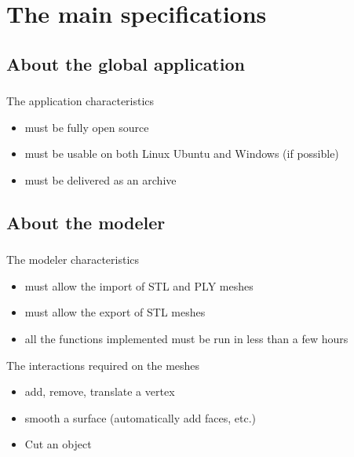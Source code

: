 \documentclass{beamer}
\begin{document}
\section{The main specifications}

\subsection{About the global application}
\begin{frame}
	\frametitle{}
	 \begin{block}{The application characteristics}
		\begin{itemize}
			\item must be fully open source
			\item must be usable on both Linux Ubuntu and Windows (if possible)
			\item must be delivered as an archive
		\end{itemize}
    \end{block}
\end{frame}
    
\subsection{About the modeler}
\begin{frame}
	\frametitle{}
	 \begin{block}{The modeler characteristics}
		\begin{itemize}
			\item must allow the import of STL and PLY meshes
			\item must allow the export of STL meshes
			\item all the functions implemented must be run in less than a few hours
		\end{itemize}
    \end{block}
    
    \begin{block}{The interactions required on the meshes}
		\begin{itemize}
			\item add, remove, translate a vertex
			\item smooth a surface (automatically add faces, etc.)
			\item Cut an object
		\end{itemize}
    \end{block}

\end{frame}
\end{document}
